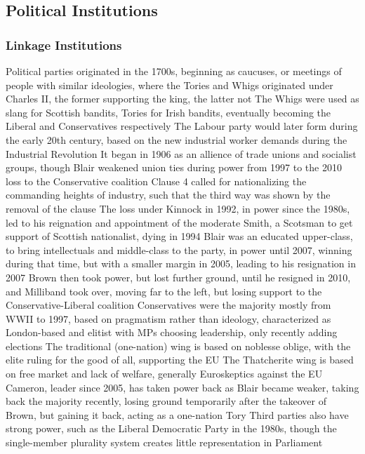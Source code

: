 \documentclass[11 pt, twoside]{article}
\newenvironment{outline*}
{
	\begin{outline}[enumerate]
	}
	{\end{outline}
}
\begin{document}
\subsection{Political Institutions}
\subsubsection{Linkage Institutions}
\begin{outline*}
\1 Political parties originated in the 1700s, beginning as caucuses, or meetings of people with similar ideologies, where the Tories and Whigs originated under Charles II, the former supporting the king, the latter not
\2 The Whigs were used as slang for Scottish bandits, Tories for Irish bandits, eventually becoming the Liberal and Conservatives respectively
\2 The Labour party would later form during the early 20th century, based on the new industrial worker demands during the Industrial Revolution
\3 It began in 1906 as an allience of trade unions and socialist groups, though Blair weakened union ties during power from 1997 to the 2010 loss to the Conservative coalition
\3 Clause 4 called for nationalizing the commanding heights of industry, such that the third way was shown by the removal of the clause
\3 The loss under Kinnock in 1992, in power since the 1980s, led to his reignation and appointment of the moderate Smith, a Scotsman to get support of Scottish nationalist, dying in 1994
\3 Blair was an educated upper-class, to bring intellectuals and middle-class to the party, in power until 2007, winning during that time, but with a smaller margin in 2005, leading to his resignation in 2007
\3 Brown then took power, but lost further ground, until he resigned in 2010, and Milliband took over, moving far to the left, but losing support to the Conservative-Liberal coalition
\2 Conservatives were the majority mostly from WWII to 1997, based on pragmatism rather than ideology, characterized as London-based and elitist with MPs choosing leadership, only recently adding elections
\3 The traditional (one-nation) wing is based on noblesse oblige, with the elite ruling for the good of all, supporting the EU
\3 The Thatcherite wing is based on free market and lack of welfare, generally Euroskeptics against the EU
\3 Cameron, leader since 2005, has taken power back as Blair became weaker, taking back the majority recently, losing ground temporarily after the takeover of Brown, but gaining it back, acting as a one-nation Tory
\2 Third parties also have strong power, such as the Liberal Democratic Party in the 1980s, though the single-member plurality system creates little representation in Parliament

\end{outline*}
\end{document}
